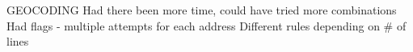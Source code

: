 GEOCODING
Had there been more time, could have tried more combinations
Had flags - multiple attempts for each address
Different rules depending on # of lines